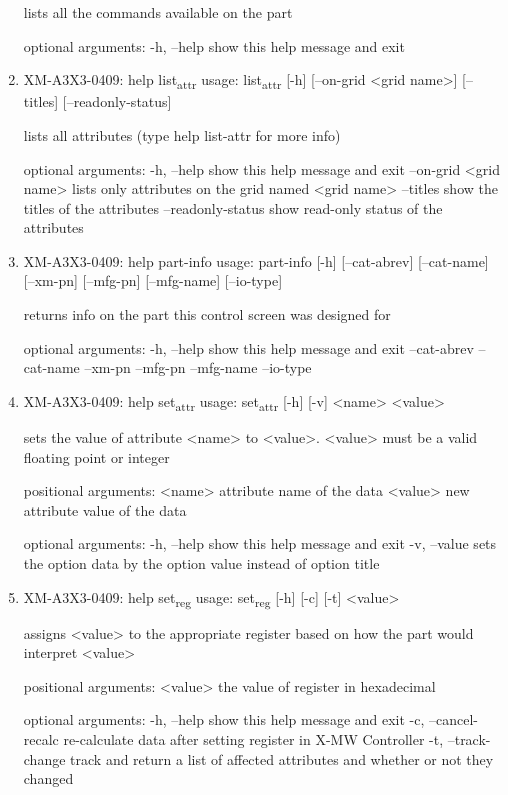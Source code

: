 \documentclass[11pt]{article}
\begin{document}
\begin{enumerate}
lists all the commands available on the part

optional arguments:
  -h, --help  show this help message and exit

\item XM-A3X3-0409: help list\textsubscript{attr}
\label{sec:org713c608}
usage: list\textsubscript{attr} [-h] [--on-grid <grid name>] [--titles] [--readonly-status]

lists all attributes (type help list-attr for more info)

optional arguments:
  -h, --help            show this help message and exit
  --on-grid <grid name>
                        lists only attributes on the grid named <grid name>
  --titles              show the titles of the attributes
  --readonly-status     show read-only status of the attributes

\item XM-A3X3-0409: help part-info
\label{sec:orgbb07981}
usage: part-info  [-h] [--cat-abrev] [--cat-name] [--xm-pn] [--mfg-pn] [--mfg-name]
        [--io-type]

returns info on the part this control screen was designed for

optional arguments:
  -h, --help   show this help message and exit
  --cat-abrev
  --cat-name
  --xm-pn
  --mfg-pn
  --mfg-name
  --io-type

\item XM-A3X3-0409: help set\textsubscript{attr}
\label{sec:org1aa3c0e}
usage: set\textsubscript{attr} [-h] [-v] <name> <value>

sets the value of attribute <name> to <value>. <value> must be a valid
floating point or integer

positional arguments:
  <name>       attribute name of the data
  <value>      new attribute value of the data

optional arguments:
  -h, --help   show this help message and exit
  -v, --value  sets the option data by the option value instead of option
               title

\item XM-A3X3-0409: help set\textsubscript{reg}
\label{sec:org362a903}
usage: set\textsubscript{reg} [-h] [-c] [-t] <value>

assigns <value> to the appropriate register based on how the part would
interpret <value>

positional arguments:
  <value>              the value of register in hexadecimal

optional arguments:
  -h, --help           show this help message and exit
  -c, --cancel-recalc  re-calculate data after setting register in X-MW
                       Controller
  -t, --track-change   track and return a list of affected attributes and
                       whether or not they changed


\end{enumerate}
\end{document}
